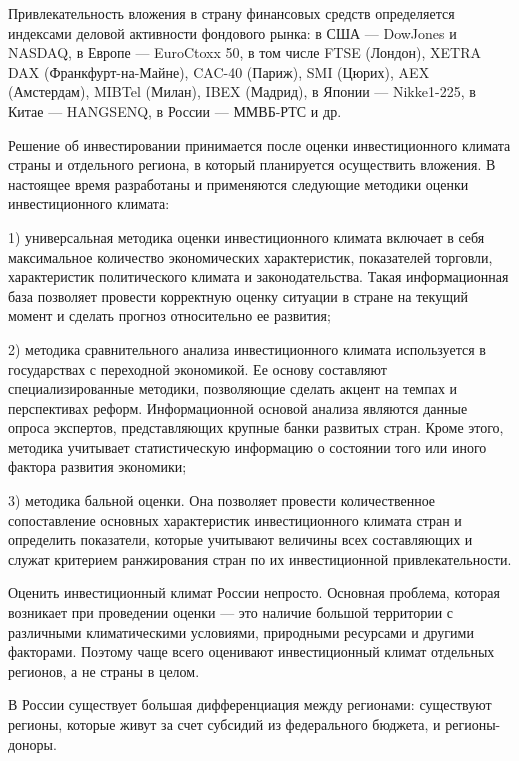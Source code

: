 Привлекательность вложения в страну финансовых средств определяется индексами деловой активности фондового рынка: в США --- DowJones и NASDAQ, в Европе --- EuroCtoxx 50,  в том числе FTSE (Лондон), XETRA DAX (Франкфурт-на-Майне), CAC-40 (Париж), SMI (Цюрих), AEX (Амстердам), MIBTel (Милан), IBEX (Мадрид), в Японии --- Nikke1-225, в Китае --- HANGSENQ, в России --- ММВБ-РТС и др.

Решение об инвестировании принимается после оценки инвестиционного климата страны и отдельного региона, в который планируется осуществить вложения.
В настоящее время разработаны и применяются следующие методики оценки инвестиционного климата:

1) универсальная методика оценки инвестиционного климата включает в себя максимальное количество экономических характеристик, показателей торговли, характеристик политического климата и законодательства.
Такая информационная база позволяет провести корректную оценку ситуации в стране на текущий момент и сделать прогноз относительно ее развития;

2) методика сравнительного анализа инвестиционного климата используется в государствах с переходной экономикой.
Ее основу составляют специализированные методики, позволяющие сделать акцент на темпах и перспективах реформ.
Информационной основой анализа являются данные опроса экспертов, представляющих крупные банки развитых стран.
Кроме этого, методика учитывает статистическую информацию о состоянии того или иного фактора развития экономики;

3) методика бальной оценки.
Она позволяет провести количественное сопоставление основных характеристик инвестиционного климата стран и определить показатели, которые учитывают величины всех составляющих и служат критерием ранжирования стран по их инвестиционной привлекательности.

Оценить инвестиционный климат России непросто.
Основная проблема, которая возникает при проведении оценки --- это наличие большой территории с различными климатическими условиями, природными ресурсами и другими факторами.
Поэтому чаще всего оценивают инвестиционный климат отдельных регионов, а не страны в целом.

В России существует большая дифференциация между регионами: существуют регионы, которые живут за счет субсидий из федерального бюджета, и регионы-доноры.

